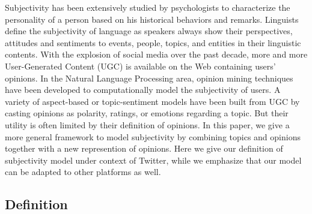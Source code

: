\documentclass[letterpaper]{article}
\begin{document}
Subjectivity has been extensively studied by psychologists to characterize the personality of a person based on his historical behaviors and remarks\cite{engbert2007agency}. 
Linguists define the subjectivity of language as speakers always show their perspectives, attitudes and sentiments to events, people, topics, and entities in their linguistic contents\cite{stein2005subjectivity}. 
With the explosion of social media over the past decade, more and more User-Generated Content (UGC) is available on the Web containing users' opinions.
In the Natural Language Processing area, opinion mining techniques\cite{liu2012sentiment} have been developed to computationally model the subjectivity of users. A variety of aspect-based or topic-sentiment models have been built from UGC by casting opinions as polarity, ratings, or emotions regarding a topic\cite{lek2013aspect,mei2007topic}. But their utility is often limited by their definition of opinions. In this paper, we give a more general framework to model subjectivity by combining topics and opinions together with a new represention of opinions. Here we give our definition of subjectivity model under context of Twitter, while we emphasize that our model can be adapted to other platforms as well.

\subsection{Definition}
\label{definition}
\end{document}
